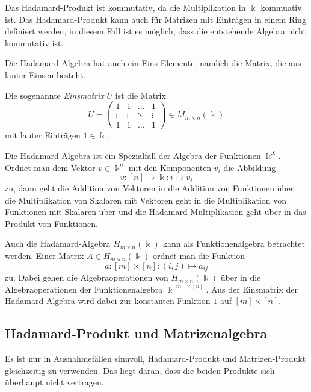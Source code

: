Das Hadamard-Produkt ist kommutativ, da die Multiplikation in $\Bbbk$
kommuativ ist.
Das Hadamard-Produkt kann auch für Matrizen mit Einträgen in einem
Ring definiert werden, in diesem Fall ist es möglich, dass die entstehende
Algebra nicht kommutativ ist.

Die Hadamard-Algebra hat auch ein Eins-Elemente, nämlich die Matrix,
die aus lauter Einsen besteht.

\begin{definition}
Die sogenannte {\em Einsmatrix} $U$ ist die Matrix
\[
U=\begin{pmatrix}
1&1&\dots&1\\
\vdots&\vdots&\ddots&\vdots\\
1&1&\dots&1
\end{pmatrix}
\in
M_{m\times n}(\Bbbk)
\]
mit lauter Einträgen $1\in\Bbbk$.
\end{definition}

Die Hadamard-Algebra ist ein Spezialfall der Algebra der Funktionen
$\Bbbk^X$.
Ordnet man dem Vektor $v\in \Bbbk^n$ mit den Komponenten $v_i$ 
die Abbildung
\[
v\colon [n] \to \Bbbk: i \mapsto v_i
\]
zu, dann geht die Addition von Vektoren in die Addition von
Funktionen über, die Multiplikation von Skalaren mit Vektoren
geht in die Multiplikation von Funktionen mit Skalaren über 
und die Hadamard-Multiplikation geht über in das Produkt von
Funktionen.

Auch die Hadamard-Algebra $H_{m\times n}(\Bbbk)$ kann als Funktionenalgebra
betrachtet werden.
Einer Matrix $A\in H_{m\times n}(\Bbbk)$ ordnet man die Funktion
\[
a\colon [m]\times [n] : (i,j) \mapsto a_{i\!j}
\]
zu.
Dabei gehen die Algebraoperationen von $H_{m\times n}(\Bbbk)$ über
in die Algebraoperationen der Funktionenalgebra $\Bbbk^{[m]\times [n]}$.
Aus der Einsmatrix der Hadamard-Algebra wird dabei zur konstanten
Funktion $1$ auf $[m]\times[n]$.

\subsection{Hadamard-Produkt und Matrizenalgebra
\label{buch:vektorenmatrizen:subsection:vertraeglichkeit}}
Es ist nur in Ausnahmefällen sinnvoll, Hadamard-Produkt und Matrizen-Produkt
gleichzeitig zu verwenden.
Das liegt daran, dass die beiden Produkte sich überhaupt nicht 
vertragen.

